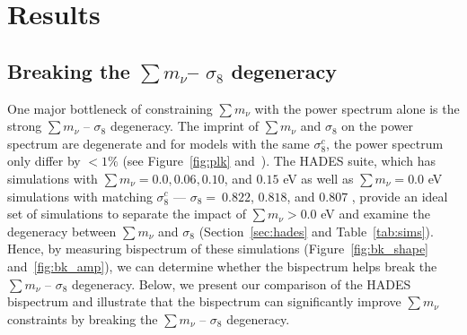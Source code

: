 \documentclass[12pt, letterpaper, preprint]{aastex62}
\newcommand{\smnu}{\sum m_\nu}
\newcommand{\sig}{\sigma_8}
\begin{document}

\section{Results} \label{sec:results} 
\subsection{Breaking the $\smnu$-- $\sig$ degeneracy} \label{sec:mnusig}
One major bottleneck of constraining $\smnu$ with the power spectrum alone is the 
strong $\smnu$ -- $\sig$ degeneracy. The imprint of $\smnu$ and $\sig$ on the power 
spectrum are degenerate and for models with the same $\sig^c$, the power spectrum
only differ by $< 1\%$ (see Figure~\ref{fig:plk} and~\citealt{villaescusa-navarro2018}). 
The HADES suite, which has simulations with $\smnu = 0.0, 0.06, 0.10$, 
and $0.15$ eV as well as $\smnu = 0.0$ eV simulations with matching $\sig^{c}$ --- 
$\sig{=}~0.822$, $0.818$, and $0.807$ , provide an ideal set of simulations to 
separate the impact of $\smnu > 0.0$ eV and examine the degeneracy between 
$\smnu$ and $\sig$ (Section~\ref{sec:hades} and Table~\ref{tab:sims}). Hence, by 
measuring bispectrum of these simulations (Figure~\ref{fig:bk_shape} and~\ref{fig:bk_amp}), 
we can determine whether the bispectrum helps break the $\smnu$ -- $\sig$ 
degeneracy. Below, we present our comparison of the HADES bispectrum and 
illustrate that the bispectrum can significantly improve $\smnu$ constraints 
by breaking the $\smnu$ -- $\sig$ degeneracy. 
\end{document}
